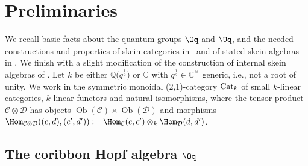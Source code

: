 \section{Preliminaries}\label{SectPreliminaries}
We recall basic facts about the quantum groups $\Oq$ and $\Uq$, and the needed constructions and properties of skein categories in~\cite{Cooke} and of stated skein algebras in \cite{Cos}. We finish with a slight modification of the construction of internal skein algebras of \cite{Gunningham}. Let $k$ be either $\mathbb{Q}\big(q^{\frac{1}{2}}\big)$ or $\mathbb{C}$ with $q^{\frac{1}{2}} \in \mathbb{C}^\times$ generic, i.e., not a root of unity. We work in the symmetric monoidal (2,1)-category ${\rm Cat}_k$ of small $k$-linear categories, $k$-linear functors and natural isomorphisms, where the tensor product $\mathcal{C} \otimes \mathcal{D}$ has objects $\operatorname{Ob}(\mathcal{C}) \times \operatorname{Ob}(\mathcal{D})$ and morphisms $\Hom_{\mathcal{C} \otimes \mathcal{D}}((c,d),(c',d')) := \Hom_\mathcal{C}(c,c') \otimes_k \Hom_\mathcal{D}(d,d')$.

\subsection[The coribbon Hopf algebra O\_\{q\textasciicircum{}2\}(SL\_2)]
{The coribbon Hopf algebra $\boldsymbol{\Oq}$}\label{SectRibCat}

